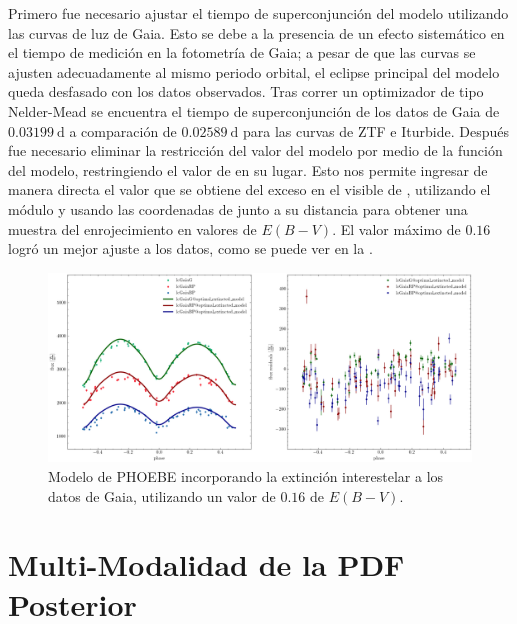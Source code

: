 Primero fue necesario ajustar el tiempo de superconjunción del modelo utilizando
las curvas de luz de Gaia. Esto se debe a la presencia de un efecto sistemático
en el tiempo de medición en la fotometría de Gaia; a pesar de que las curvas se
ajusten adecuadamente al mismo periodo orbital, el eclipse principal del modelo
queda desfasado con los datos observados. Tras correr un optimizador de tipo
Nelder-Mead se encuentra el tiempo de superconjunción de los datos de Gaia de
$0.03199 \ \mathrm{d}$ a comparación de $0.02589 \ \mathrm{d}$ para las curvas
de ZTF e Iturbide. Después fue necesario eliminar la restricción del valor
 del modelo por medio de la función  del
modelo, restringiendo el valor de  en su lugar. Esto nos permite
ingresar de manera directa el valor que se obtiene del exceso en el visible de
, utilizando el módulo  y usando las
coordenadas de \atoObjId junto a su distancia para obtener una muestra del
enrojecimiento en valores de $E(B-V)$. El valor máximo de $0.16$ logró un mejor
ajuste a los datos, como se puede ver en la
.

\begin{figure}[!ht]
    \centering
    \includegraphics[scale=0.45]{Conclusion/Figures/Figura Phoebe Gaia Extinguido.png}
    \caption{Modelo de PHOEBE incorporando la extinción interestelar a los datos
    de Gaia, utilizando un valor de $0.16$ de $E(B-V)$.}
    \label{figuraPhoebeGaiaExtinguido}
\end{figure}

\section{Multi-Modalidad de la PDF Posterior}

